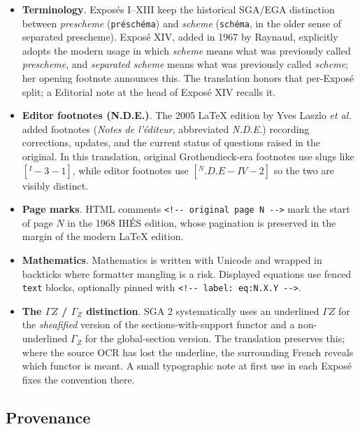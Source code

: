 \documentclass[
]{article}
\begin{document}
\begin{itemize}
\item
  \textbf{Terminology}. Exposés I--XIII keep the historical SGA/EGA
  distinction between \emph{prescheme} (\texttt{préschéma}) and
  \emph{scheme} (\texttt{schéma}, in the older sense of separated
  prescheme). Exposé XIV, added in 1967 by Raynaud, explicitly adopts
  the modern usage in which \emph{scheme} means what was previously
  called \emph{prescheme}, and \emph{separated scheme} means what was
  previously called \emph{scheme}; her opening footnote announces this.
  The translation honors that per-Exposé split; a Editorial note at the
  head of Exposé XIV recalls it.
\item
  \textbf{Editor footnotes (N.D.E.)}. The 2005 LaTeX edition by Yves
  Laszlo \emph{et al.} added footnotes (\emph{Notes de l'éditeur},
  abbreviated \emph{N.D.E.}) recording corrections, updates, and the
  current status of questions raised in the original. In this
  translation, original Grothendieck-era footnotes use slugs like
  \([{}^{I}-3-1]\), while editor footnotes use \([{}^{N}.D.E-IV-2]\) so
  the two are visibly distinct.
\item
  \textbf{Page marks}. HTML comments
  \texttt{\textless{}!-\/-\ original\ page\ N\ -\/-\textgreater{}} mark
  the start of page \(N\) in the 1968 IHÉS edition, whose pagination is
  preserved in the margin of the modern LaTeX edition.
\item
  \textbf{Mathematics}. Mathematics is written with Unicode and wrapped
  in backticks where formatter mangling is a risk. Displayed equations
  use fenced
  \texttt{\textasciigrave{}\textasciigrave{}\textasciigrave{}text}
  blocks, optionally pinned with
  \texttt{\textless{}!-\/-\ label:\ eq:N.X.Y\ -\/-\textgreater{}}.
\item
  \textbf{The \(\Gamma Z\) / \(\Gamma_{Z}\) distinction}. SGA 2
  systematically uses an underlined \(\Gamma Z\) for the
  \emph{sheafified} version of the sections-with-support functor and a
  non-underlined \(\Gamma_{Z}\) for the global-section version. The
  translation preserves this; where the source OCR has lost the
  underline, the surrounding French reveals which functor is meant. A
  small typographic note at first use in each Exposé fixes the
  convention there.
\end{itemize}

\subsection{Provenance}\label{provenance}
\end{document}
